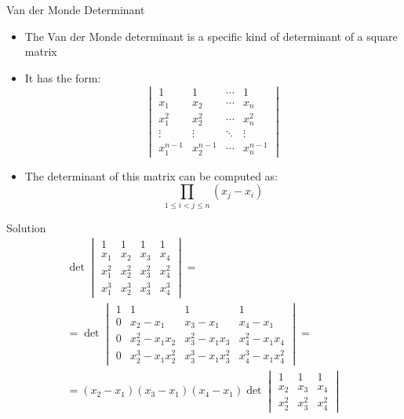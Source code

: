 \documentclass[fullscreen=true, bookmarks=true, hyperref={pdfencoding=unicode}]{beamer}
\begin{document}
\begin{frame}{Van der Monde Determinant}
  \begin{itemize}
    \item The Van der Monde determinant is a specific kind of determinant of a square matrix
    \item It has the form:
      \[
      \begin{vmatrix}
        1      & 1      & \cdots & 1      \\
        x_1    & x_2    & \cdots & x_n    \\
        x_1^2  & x_2^2  & \cdots & x_n^2  \\
        \vdots & \vdots & \ddots & \vdots \\
        x_1^{n-1} & x_2^{n-1} & \cdots & x_n^{n-1}
      \end{vmatrix}
      \]
    \pause
    \item The determinant of this matrix can be computed as:
      \[
      \prod_{1 \leq i < j \leq n} (x_j - x_i)
      \]
  \end{itemize}
\end{frame}


\begin{frame}{Solution}
  \begin{align*}
    \det 
    \begin{vmatrix}
      1      & 1      & 1 & 1  \\
      x_1    & x_2    & x_3 & x_4    \\
      x_1^2  & x_2^2  & x_3^2 & x_4^2  \\
      x_1^{3} & x_2^{3} & x_3^{3} & x_4^{3}
    \end{vmatrix}  
    = \\ = \det 
    \begin{vmatrix}
      1      & 1      & 1 & 1      \\
      0    & x_2 - x_1 & x_3 - x_1 & x_4 - x_1 \\
      0  & x_2^2 - x_1x_2  & x_3^2 - x_1x_3 & x_4^2 - x_1x_4  \\
      0 & x_2^{3} - x_1x_2^2 & x_3^{3} - x_1x_3^2 & x_4^{3}- x_1x_4^2
    \end{vmatrix} = \\ =
    (x_2 - x_1) (x_3 - x_1) (x_4 - x_1) \det 
    \begin{vmatrix}
      1      & 1      & 1 \\
      x_2    & x_3    & x_4 \\
      x_2^2  & x_3^2 & x_4^2 
    \end{vmatrix}  
  \end{align*}
\end{frame}
\end{document}
